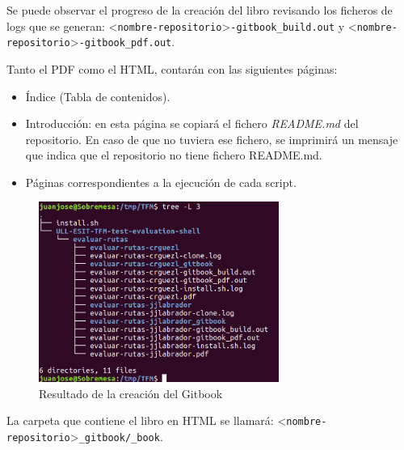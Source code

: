 		
		Se puede observar el progreso de la creación del libro revisando los ficheros de logs que se generan: \textless \verb|nombre-repositorio|\textgreater \verb|-gitbook_build.out| y \textless \verb|nombre-repositorio|\textgreater \verb|-gitbook_pdf.out|.
		
\bigskip
		Tanto el PDF como el HTML, contarán con las siguientes páginas:
		
		\begin{itemize}
			\item Índice (Tabla de contenidos).
			\item Introducción: en esta página se copiará el fichero {\it README.md} del repositorio. En caso de que no tuviera ese fichero, se imprimirá un mensaje que indica que el repositorio no tiene fichero README.md.
			\item Páginas correspondientes a la ejecución de cada script.
		\end{itemize}
		
		
		\begin{figure}[H]
		\begin{center}
		\includegraphics[width=0.7\textwidth]{images/ghshell8-2}
		\caption{Resultado de la creación del Gitbook}
		\label{fig:ghshell8-2}
		\end{center}
		\end{figure}
		
		La carpeta que contiene el libro en HTML se llamará: \newline
		\textless \verb|nombre-repositorio|\textgreater \verb|_gitbook/|\verb|_book|. 
		

